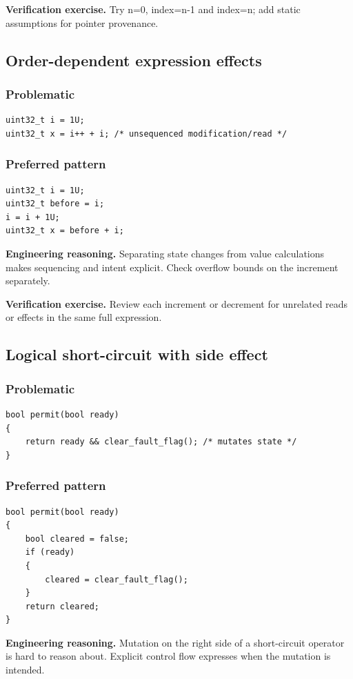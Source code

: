 \documentclass[10pt,letterpaper]{article}
\begin{document}
\textbf{Verification exercise.} Try n=0, index=n-1 and index=n; add static assumptions for pointer provenance.

\subsection{Order-dependent expression effects}
\subsubsection*{Problematic}
\begin{lstlisting}[style=engineerc]
uint32_t i = 1U;
uint32_t x = i++ + i; /* unsequenced modification/read */
\end{lstlisting}
\subsubsection*{Preferred pattern}
\begin{lstlisting}[style=engineerc]
uint32_t i = 1U;
uint32_t before = i;
i = i + 1U;
uint32_t x = before + i;
\end{lstlisting}
\textbf{Engineering reasoning.} Separating state changes from value calculations makes sequencing and intent explicit. Check overflow bounds on the increment separately.

\textbf{Verification exercise.} Review each increment or decrement for unrelated reads or effects in the same full expression.

\subsection{Logical short-circuit with side effect}
\subsubsection*{Problematic}
\begin{lstlisting}[style=engineerc]
bool permit(bool ready)
{
    return ready && clear_fault_flag(); /* mutates state */
}
\end{lstlisting}
\subsubsection*{Preferred pattern}
\begin{lstlisting}[style=engineerc]
bool permit(bool ready)
{
    bool cleared = false;
    if (ready)
    {
        cleared = clear_fault_flag();
    }
    return cleared;
}
\end{lstlisting}
\textbf{Engineering reasoning.} Mutation on the right side of a short-circuit operator is hard to reason about. Explicit control flow expresses when the mutation is intended.
\end{document}

